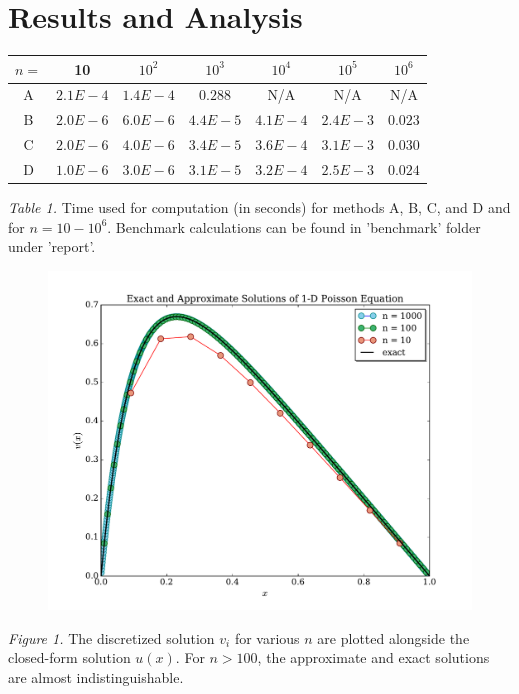 \documentclass[prb,aps,twocolumn,showpacs,10pt]{revtex4-1}
\begin{document}
\section{Results and Analysis}


\begin{center}
\begin{tabular}{|c|c|c|c|c|c|c|}
\hline
$n=$&10&$10^2$&$10^3$&$10^4$&$10^5$&$10^6$\\
\hline
\hline
A & $2.1E-4$ &$1.4E-4$&$0.288$& N/A & N/A & N/A\\
\hline
B & $2.0E-6$ &$6.0E-6$&$4.4E-5$& $4.1E-4$ & $2.4E-3$ & $0.023$\\
\hline
C & $2.0E-6$ &$4.0E-6$&$3.4E-5$& $3.6E-4$ & $3.1E-3$ & $0.030$\\
\hline
D & $1.0E-6$ &$3.0E-6$&$3.1E-5$& $3.2E-4$ & $2.5E-3$ & $0.024$\\
\hline 
\end{tabular}
\vspace{2mm}

\textit{Table 1.} Time used for computation (in seconds) for methods A, B, C, and D and for $n=10-10^6$. Benchmark calculations can be found in 'benchmark' folder under 'report'.
\end{center}




\begin{center}
\begin{figure}
\includegraphics[scale=0.7]{compare_simple}
\end{figure}
\textit{Figure 1.} The discretized solution $v_i$ for various $n$ are plotted alongside the closed-form solution $u(x)$. For $n>100$, the approximate and exact solutions are almost indistinguishable. 
\end{center}
\end{document}
